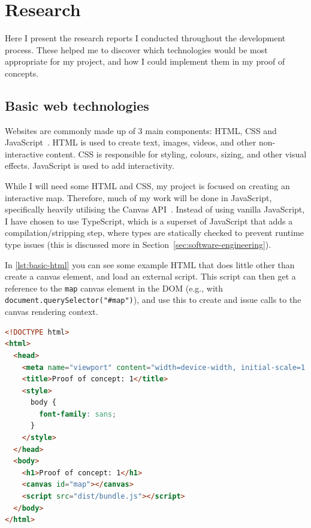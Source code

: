 \documentclass{final_report}
\begin{document}
\clearpage
\chapter{Research}

Here I present the research reports I conducted throughout the development process. These helped me to discover which technologies would be most appropriate for my project, and how I could implement them in my proof of concepts.

\section{Basic web technologies}

Websites are commonly made up of 3 main components: HTML, CSS and JavaScript~\cite{mdn-html}. HTML is used to create text, images, videos, and other non-interactive content. CSS is responsible for styling, colours, sizing, and other visual effects. JavaScript is used to add interactivity.

While I will need some HTML and CSS, my project is focused on creating an interactive map. Therefore, much of my work will be done in JavaScript, specifically heavily utilising the Canvas API~\cite{mdn-canvas-api}. Instead of using vanilla JavaScript, I have chosen to use TypeScript, which is a superset of JavaScript that adds a compilation/stripping step, where types are statically checked to prevent runtime type issues (this is discussed more in Section~\ref{sec:software-engineering}).

In \autoref{lst:basic-html} you can see some example HTML that does little other than create a canvas element, and load an external script. This script can then get a reference to the \texttt{map} canvas element in the DOM (e.g., with \texttt{document.querySelector("\#map")}), and use this to create and issue calls to the canvas rendering context.

\begin{lstlisting}[caption=Basic HTML to run an external script with some basic styling, language=html, label=lst:basic-html]
<!DOCTYPE html>
<html>
  <head>
    <meta name="viewport" content="width=device-width, initial-scale=1.0" />
    <title>Proof of concept: 1</title>
    <style>
      body {
        font-family: sans;
      }
    </style>
  </head>
  <body>
    <h1>Proof of concept: 1</h1>
    <canvas id="map"></canvas>
    <script src="dist/bundle.js"></script>
  </body>
</html>
\end{lstlisting}
\end{document}
